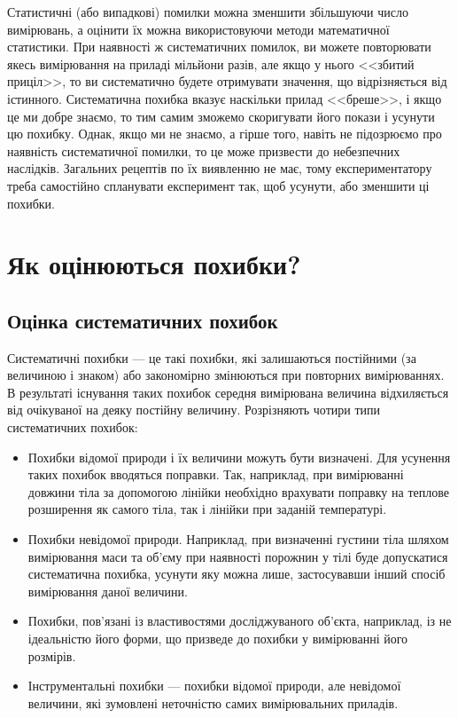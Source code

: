 \documentclass{LabBook}
\begin{document}
Статистичні (або випадкові) помилки можна зменшити збільшуючи число вимірювань, а оцінити їх можна використовуючи методи математичної статистики. При наявності ж систематичних помилок, ви можете повторювати якесь вимірювання на приладі мільйони разів, але якщо у нього <<збитий приціл>>, то ви систематично будете отримувати значення, що відрізняється від істинного. Систематична похибка вказує наскільки прилад <<бреше>>, і якщо це ми добре знаємо, то тим самим зможемо скоригувати його покази і усунути цю похибку. Однак, якщо ми не знаємо, а гірше того, навіть не підозрюємо про наявність систематичної помилки, то це може призвести до небезпечних наслідків. Загальних рецептів по їх виявленню не має, тому експериментатору треба самостійно спланувати експеримент так, щоб усунути, або зменшити ці похибки.


\chapter{Як оцінюються похибки?}






\section{Оцінка систематичних похибок}




Систематичні похибки --- це такі похибки, які залишаються постійними (за величиною і знаком) або закономірно змінюються при повторних вимірюваннях. В результаті існування таких похибок середня вимірювана величина відхиляється від очікуваної на деяку постійну величину.
Розрізняють чотири типи систематичних похибок:
\begin{itemize}
\item Похибки відомої природи і їх величини можуть бути визначені. Для усунення таких похибок вводяться поправки. Так, наприклад, при вимірюванні довжини тіла за допомогою лінійки необхідно врахувати поправку на теплове розширення як самого тіла, так і лінійки при заданій температурі.
\item Похибки невідомої природи. Наприклад, при визначенні густини тіла шляхом вимірювання маси та об’єму при наявності порожнин у тілі буде допускатися систематична похибка, усунути яку можна лише, застосувавши інший спосіб вимірювання даної величини.
\item Похибки, пов’язані із властивостями досліджуваного об’єкта, наприклад, із не ідеальністю його форми, що призведе до похибки у вимірюванні його розмірів.
\item Інструментальні похибки --- похибки відомої природи, але невідомої величини, які зумовлені неточністю самих вимірювальних приладів.
\end{itemize}
\end{document}
